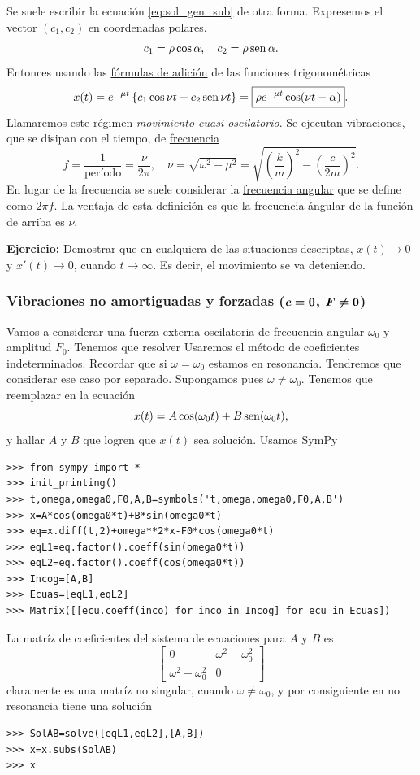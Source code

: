 Se suele escribir la ecuación \eqref{eq:sol_gen_sub} de otra forma. Expresemos el vector $(c_1,c_2)$ en
coordenadas polares.
\[
c_1=\rho\cos\alpha,\quad c_2=\rho\sen\alpha.
\]
Entonces usando las
\href{https://es.wikipedia.org/wiki/Identidades_trigonom%C3%A9tricas}{fórmulas de adición}
de las funciones trigonométricas
\[
x(t)=e^{-\mu t}\left\{ c_1\cos \nu t+c_2\sen \nu t \right\}=\boxed{\rho e^{-\mu t}\cos(\nu t-\alpha)}.
\]
Llamaremos este régimen \emph{movimiento cuasi-oscilatorio}. Se ejecutan vibraciones, que se disipan con el tiempo,
de \href{http://es.wikipedia.org/wiki/Frecuencia}{frecuencia}
\[
f=\frac{1}{\text{período}}=\frac{\nu}{2\pi},\quad \nu=\sqrt{\omega^2-\mu^2}=\sqrt{\left(\frac{k}{m}\right)^2-
\left(\frac{c}{2m}\right)^2}.
\]
En lugar de la frecuencia se suele considerar la
\href{http://luz.izt.uam.mx/mediawiki/index.php/Frecuencia_angular}{frecuencia angular} que se define como
$2\pi f$. La ventaja de esta definición es que la frecuencia ángular de la función de arriba es
$\nu$.


\noindent\textbf{Ejercicio:} Demostrar que en cualquiera de las situaciones descriptas, $x(t)\to 0$ y $x'(t)\to 0$, cuando $t\to\infty$.
Es decir, el movimiento se va deteniendo.


\subsubsection{ Vibraciones no amortiguadas y forzadas ($\b{c=0}$, $\b{F\neq 0}$) }
Vamos a considerar una fuerza externa oscilatoria de frecuencia angular $\omega_0$ y amplitud $F_0$. Tenemos que resolver
Usaremos el método de coeficientes indeterminados.  Recordar que si $\omega=\omega_0$ estamos en
resonancia. Tendremos que considerar ese caso por separado. Supongamos pues $\omega\neq\omega_0$.
Tenemos que  reemplazar en la ecuación
\[x(t)=A\cos(\omega_0 t)+B\sen(\omega_0 t),\]
y hallar $A$ y $B$ que logren que $x(t)$ sea solución. Usamos SymPy

\begin{lstlisting}
>>> from sympy import *
>>> init_printing()
>>> t,omega,omega0,F0,A,B=symbols('t,omega,omega0,F0,A,B')
>>> x=A*cos(omega0*t)+B*sin(omega0*t)
>>> eq=x.diff(t,2)+omega**2*x-F0*cos(omega0*t)
>>> eqL1=eq.factor().coeff(sin(omega0*t))
>>> eqL2=eq.factor().coeff(cos(omega0*t))
>>> Incog=[A,B]
>>> Ecuas=[eqL1,eqL2]
>>> Matrix([[ecu.coeff(inco) for inco in Incog] for ecu in Ecuas])

\end{lstlisting}
La matríz de coeficientes del sistema de ecuaciones para $A$ y $B$ es
\[\left[\begin{matrix}0 & \omega^{2} - \omega_{0}^{2}\\\omega^{2} - \omega_{0}^{2} & 0\end{matrix}\right]\]
claramente es una matríz no singular, cuando $\omega\neq \omega_0$, y por consiguiente  en no resonancia
tiene una solución
\begin{lstlisting}
>>> SolAB=solve([eqL1,eqL2],[A,B])
>>> x=x.subs(SolAB)
>>> x
\end{lstlisting}

